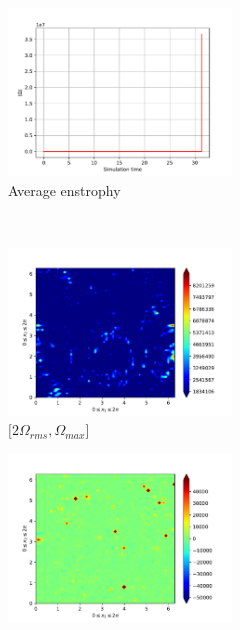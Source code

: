 \begin{figure}[H]
    \begin{subfigure}[H]{0.45\textwidth}
        \includegraphics[height=1.75in]{media/run-cds-65-25k/enst-average2449.png}
        \caption{Average enstrophy}
    \end{subfigure}
    ~
    \begin{subfigure}[H]{0.45\textwidth}
        \includegraphics[height=1.75in]{media/run-cds-65-25k/enst-2-2449.png}
        \caption{$[2\Omega_{rms}, \Omega_{max} $] }
    \end{subfigure}
    \newline
    \begin{subfigure}[H]{0.45\textwidth}
        \includegraphics[height=1.75in]{media/run-cds-65-25k/enst-2449.png}

\end{subfigure}
\end{figure}
